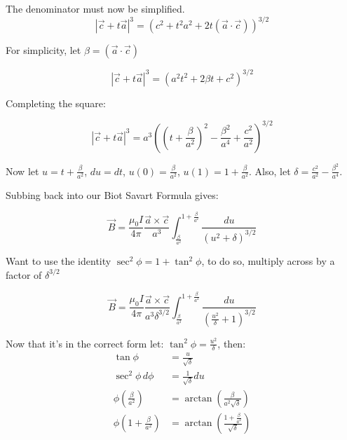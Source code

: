 \documentclass[12pt,a4paper]{report}
\begin{document}
The denominator must now be simplified.
\begin{equation}
  \left\vert \vec{c} + t\vec{a} \right \vert ^3 = \left( c^2 + t^2a^2 + 2t(\vec{a}\cdot \vec{c}) \right)^{3/2}
\end{equation}

For simplicity, let $\beta = (\vec{a} \cdot \vec{c})$

\begin{equation}
  \left\vert \vec{c} + t\vec{a} \right \vert ^3 =  \left( a^2t^2 + 2\beta t + c^2  \right)^{3/2}
\end{equation}

Completing the square:

\begin{equation}
  \left\vert \vec{c} + t\vec{a} \right \vert ^3 =  a^{3} \left( \left ( t + \frac{\beta}{a^2} \right)^2 -\frac{\beta^2}{a^4} + \frac{c^2}{a^2} \right)^{3/2}
\end{equation}

Now let $u = t + \frac{\beta}{a^2}$, $du = dt$, $u(0) = \frac{\beta}{a^2}$, $u(1) = 1 + \frac{\beta}{a^2}$. Also, let $\delta = \frac{c^2}{a^2} - \frac{\beta^2}{a^4}$.

Subbing back into our Biot Savart Formula gives:

\begin{equation}
  \vec{B} = \frac{\mu_0 I}{4\pi} \frac{\vec{a} \times \vec{c}}{a^3} \int_{\frac{\beta}{a^2}}^{1+\frac{\beta}{a^2}} \frac{du}{\left(u^2 + \delta\right)^{3/2}}
\end{equation}

Want to use the identity $\sec^2\phi = 1 + \tan^2\phi$, to do so, multiply across by a factor of $\delta^{3/2}$

\begin{equation}
  \vec{B} = \frac{\mu_0 I}{4\pi} \frac{\vec{a} \times \vec{c}}{a^3\delta^{3/2}} \int_{\frac{\beta}{a^2}}^{1+\frac{\beta}{a^2}} \frac{du}{\left(\frac{u^2}{\delta} + 1 \right)^{3/2}}
\end{equation}

Now that it's in the correct form let: $\tan^2\phi = \frac{u^2}{\delta}$, then: 
\begin{align*}
  \tan\phi &= \frac{u}{\sqrt{\delta}} \\
  \sec^2\phi \, d\phi &= \frac{1}{\sqrt{\delta}} du \\
  \phi\left(\frac{\beta}{a^2}\right) &= \arctan \left( \frac{\beta}{a^2\sqrt{\delta}} \right) \\
  \phi\left( 1 + \frac{\beta}{a^2} \right) &= \arctan \left( \frac{1+\frac{\beta}{a^2}}{\sqrt{\delta}} \right)
\end{align*}
\end{document}
